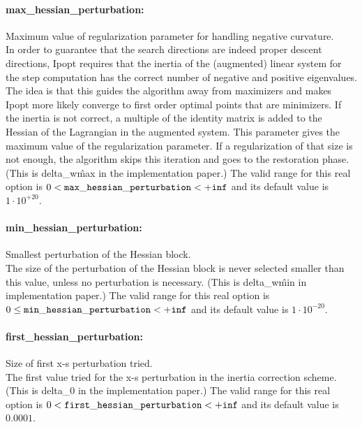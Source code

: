 \paragraph{max\_hessian\_perturbation:}\label{opt:max_hessian_perturbation} Maximum value of regularization parameter for handling negative curvature. \\
 In order to guarantee that the search directions are indeed proper descent directions, Ipopt requires that the inertia of the (augmented) linear system for the step computation has the correct number of negative and positive eigenvalues. The idea is that this guides the algorithm away from maximizers and makes Ipopt more likely converge to first order optimal points that are minimizers. If the inertia is not correct, a multiple of the identity matrix is added to the Hessian of the Lagrangian in the augmented system. This parameter gives the maximum value of the regularization parameter. If a regularization of that size is not enough, the algorithm skips this iteration and goes to the restoration phase. (This is delta\_w\^max in the implementation paper.) The valid range for this real option is 
$0 <  {\tt max\_hessian\_perturbation } <  {\tt +inf}$
and its default value is $1 \cdot 10^{+20}$.


\paragraph{min\_hessian\_perturbation:}\label{opt:min_hessian_perturbation} Smallest perturbation of the Hessian block. \\
 The size of the perturbation of the Hessian block is never selected smaller than this value, unless no perturbation is necessary. (This is delta\_w\^min in implementation paper.) The valid range for this real option is 
$0 \le {\tt min\_hessian\_perturbation } <  {\tt +inf}$
and its default value is $1 \cdot 10^{-20}$.


\paragraph{first\_hessian\_perturbation:}\label{opt:first_hessian_perturbation} Size of first x-s perturbation tried. \\
 The first value tried for the x-s perturbation in the inertia correction scheme.(This is delta\_0 in the implementation paper.) The valid range for this real option is 
$0 <  {\tt first\_hessian\_perturbation } <  {\tt +inf}$
and its default value is $0.0001$.


